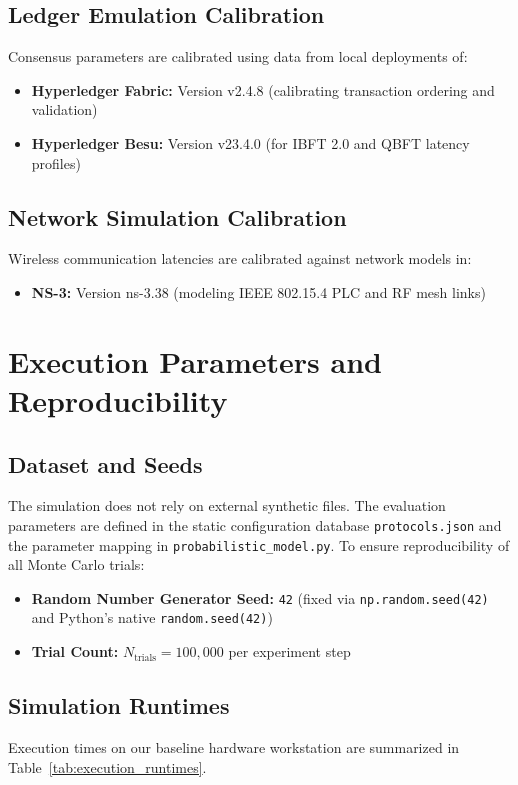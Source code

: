 \documentclass[12pt, oneside, a4paper]{report}
\theoremstyle{definition}
\theoremstyle{remark}
\begin{document}
\subsection{Ledger Emulation Calibration}
Consensus parameters are calibrated using data from local deployments of:
\begin{itemize}
  \item \textbf{Hyperledger Fabric:} Version v2.4.8 (calibrating transaction ordering and validation)
  \item \textbf{Hyperledger Besu:} Version v23.4.0 (for IBFT 2.0 and QBFT latency profiles)
\end{itemize}

\subsection{Network Simulation Calibration}
Wireless communication latencies are calibrated against network models in:
\begin{itemize}
  \item \textbf{NS-3:} Version ns-3.38 (modeling IEEE 802.15.4 PLC and RF mesh links)
\end{itemize}

\section{Execution Parameters and Reproducibility}
\label{sec:ei:parameters}

\subsection{Dataset and Seeds}
The simulation does not rely on external synthetic files. The evaluation parameters are defined in the static configuration database \texttt{protocols.json} and the parameter mapping in \texttt{probabilistic\_model.py}.
To ensure reproducibility of all Monte Carlo trials:
\begin{itemize}
  \item \textbf{Random Number Generator Seed:} \texttt{42} (fixed via \texttt{np.random.seed(42)} and Python's native \texttt{random.seed(42)})
  \item \textbf{Trial Count:} $N_{\mathrm{trials}} = 100{,}000$ per experiment step
\end{itemize}

\subsection{Simulation Runtimes}
Execution times on our baseline hardware workstation are summarized in Table~\ref{tab:execution_runtimes}.
\end{document}
